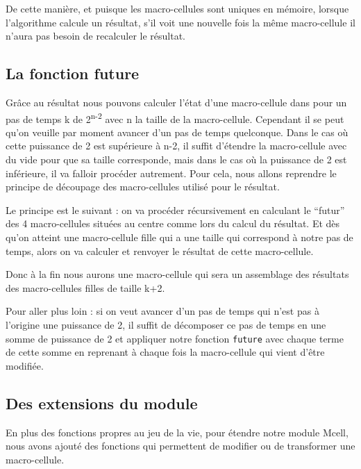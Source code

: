 \documentclass[a4paper,12pt]{report}
\begin{document}
De cette manière, et puisque les macro-cellules sont uniques en mémoire, lorsque
l'algorithme calcule un résultat, s'il voit une nouvelle fois la même
macro-cellule il n'aura pas besoin de recalculer le résultat.

\subsection*{La fonction future}

Grâce au résultat nous pouvons calculer l'état d'une macro-cellule
dans pour un pas de temps k de 2\textsuperscript{n-2} avec n la taille
de la macro-cellule. Cependant il se peut qu'on veuille par moment
avancer d'un pas de temps quelconque.
Dans le cas où cette puissance de 2 est supérieure à n-2, il suffit
d'étendre la macro-cellule avec du vide pour que sa taille
corresponde, mais dans le cas où la puissance de 2 est inférieure, il
va falloir procéder autrement.
Pour cela, nous allons reprendre le principe de découpage des
macro-cellules utilisé pour le résultat.

Le principe est le suivant : on va procéder récursivement en calculant
le ``futur'' des 4 macro-cellules situées au centre comme lors du calcul du
résultat. Et dès qu'on atteint une macro-cellule fille qui a une taille
qui correspond à notre pas de temps, alors on va calculer et renvoyer
le résultat de cette macro-cellule.

\medskip

Donc à la fin nous aurons une macro-cellule qui sera un assemblage des
résultats des macro-cellules filles de taille k+2.

Pour aller plus loin : si on veut avancer d'un pas de temps qui n'est pas à
l'origine une puissance de 2, il suffit de décomposer ce pas de temps en une
somme de puissance de 2 et appliquer notre fonction \texttt{future} avec chaque
terme de cette somme en reprenant à chaque fois la macro-cellule qui vient
d'être modifiée.

\subsection*{Des extensions du module}

En plus des fonctions propres au jeu de la vie, pour étendre notre
module Mcell, nous avons ajouté des fonctions qui permettent
de modifier ou de transformer une macro-cellule.
\end{document}
